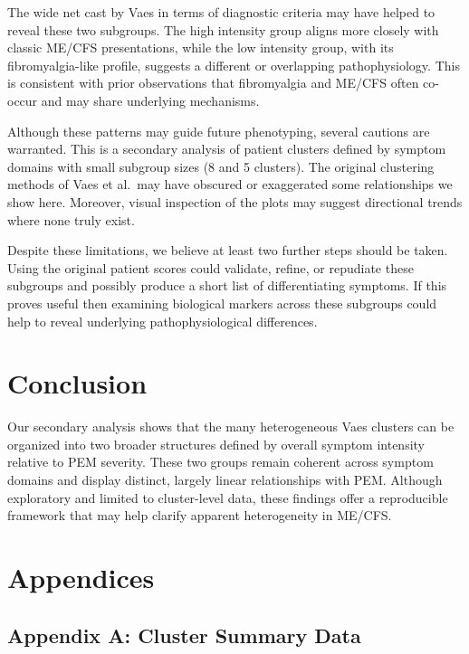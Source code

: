 \documentclass[
  letterpaper,
  DIV=11,
  numbers=noendperiod]{scrartcl}
\begin{document}
The wide net cast by Vaes in terms of diagnostic criteria may have
helped to reveal these two subgroups. The high intensity group aligns
more closely with classic ME/CFS presentations, while the low intensity
group, with its fibromyalgia-like profile, suggests a different or
overlapping pathophysiology. This is consistent with prior observations
that fibromyalgia and ME/CFS often co-occur and may share underlying
mechanisms.

Although these patterns may guide future phenotyping, several cautions
are warranted. This is a secondary analysis of patient clusters defined
by symptom domains with small subgroup sizes (8 and 5 clusters). The
original clustering methods of Vaes et al.~may have obscured or
exaggerated some relationships we show here. Moreover, visual inspection
of the plots may suggest directional trends where none truly exist.

Despite these limitations, we believe at least two further steps should
be taken. Using the original patient scores could validate, refine, or
repudiate these subgroups and possibly produce a short list of
differentiating symptoms. If this proves useful then examining
biological markers across these subgroups could help to reveal
underlying pathophysiological differences.

\section{Conclusion}\label{conclusion}

Our secondary analysis shows that the many heterogeneous Vaes clusters
can be organized into two broader structures defined by overall symptom
intensity relative to PEM severity. These two groups remain coherent
across symptom domains and display distinct, largely linear
relationships with PEM. Although exploratory and limited to
cluster-level data, these findings offer a reproducible framework that
may help clarify apparent heterogeneity in ME/CFS.

\clearpage

\section{Appendices}\label{appendices}

\FloatBarrier

\subsection{Appendix A: Cluster Summary
Data}\label{appendix-a-cluster-summary-data}
\end{document}
